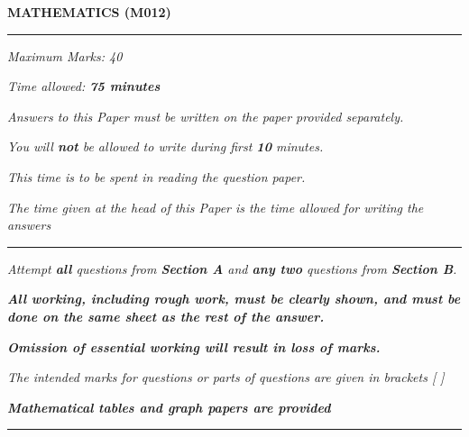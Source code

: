 \begin{center}
   \Large
   \textbf{MATHEMATICS (M012)}
   \rule{\textwidth}{0.4pt}
   \normalsize
   \textit{Maximum Marks: 40}

   \textit{Time allowed: \textbf{75 minutes}}

   \textit{Answers to this Paper must be written on the paper provided separately.}

   \textit{You will \textbf{not} be allowed to write during first \textbf{10} minutes.}

   \textit{This time is to be spent in reading the question paper.}

   \textit{The time given at the head of this Paper is the time allowed for writing the answers}
   \rule{\textwidth}{0.4pt}
   \small

   \textit{Attempt \textbf{all} questions from \textbf{Section A} and \textbf{any two} questions from \textbf{Section B}.}

   \textit{\textbf{All working, including rough work, must be clearly shown, and must be done on the same sheet as the rest of the answer.}}

   \textit{\textbf{Omission of essential working will result in loss of marks.}}

   \textit{The intended marks for questions or parts of questions are given in brackets [ ]}

   \textit{\textbf{Mathematical tables and graph papers are provided}}
   \rule{\textwidth}{0.4pt}
\end{center}
